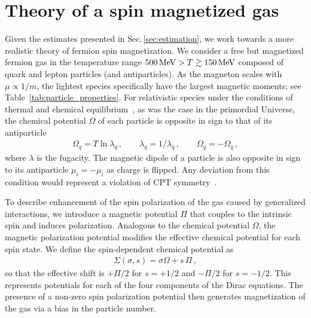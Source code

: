 \documentclass[epjST]{svjour}
\newcommand*{\MeV}{\text{\,MeV}}
\newcommand{\rsec}[1]{Sec.\,{\ref{#1}}}
\begin{document}
\section{Theory of a spin magnetized gas\label{sec:magnetization}}
{\color{blue}Given the estimates presented in \rsec{sec:estimation}, we work towards a more realistic theory of fermion spin magnetization.} We consider a free but magnetized fermion gas in the temperature range \(500\MeV>T\gtrsim150\MeV\) composed of quark and lepton particles (and antiparticles). {\color{blue}As the magneton scales with \(\mu \propto 1/m\), the lightest species specifically have the largest magnetic moments; see Table~\ref{tab:particle_properties}.} For relativistic species under the conditions of thermal and chemical equilibrium~\cite{Elze:1980er}, as was the case in the primordial Universe, the chemical potential \(\Omega\) of each particle is opposite in sign to that of its antiparticle
\begin{align}
\label{eq:equilibirum_conditions}
\Omega_{q}=T\ln\lambda_{q}\,,\qquad
\lambda_{q}=1/\lambda_{\bar{q}}\,,\qquad
\Omega_{q}=-\Omega_{\bar{q}}\,,
\end{align}
where \(\lambda\) is the fugacity. The magnetic dipole of a particle is also opposite in sign to its antiparticle $\mu_{i}=-\mu_{\bar{i}}$ as charge is flipped. Any deviation from this condition would represent a violation of CPT {\color{blue}symmetry}~\cite{Colladay:1996iz,Bluhm:1997ci,BASE:2016yuo}.

{\color{blue}To describe enhancement of the spin polarization of the gas caused by generalized interactions, we introduce a magnetic potential \(\Pi\) that couples to the intrinsic spin and induces polarization. Analogous to the chemical potential \(\Omega\), the magnetic polarization potential modifies the effective chemical potential for each spin state. We define the spin-dependent chemical potential as
\begin{align}
\Sigma(\sigma,s) = \sigma\Omega + s\,\Pi\,,
\end{align}
so that the effective shift is \(+\Pi/2\) for \(s=+1/2\) and \(-\Pi/2\) for \(s=-1/2\). This represents potentials for each of the four components of the Dirac equations. The presence of a non-zero spin polarization potential then generates magnetization of the gas via a bias in the particle number.}
\end{document}
